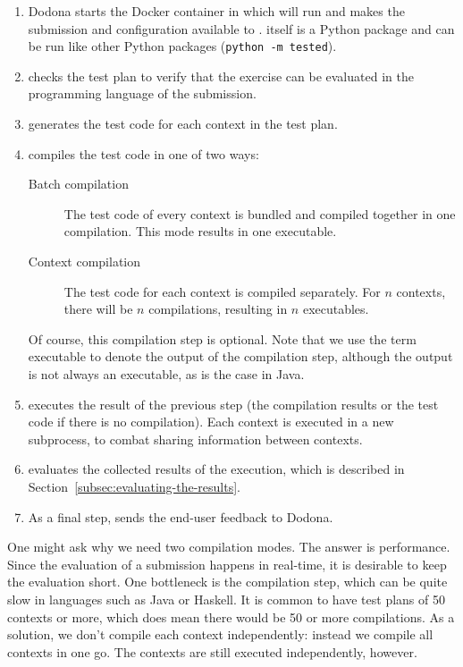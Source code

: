 \documentclass[5p,number]{elsarticle}
\begin{document}
    \begin{enumerate}
        \item Dodona starts the Docker container in which \tested{} will run and makes the submission and configuration available to \tested{}.
        \tested{} itself is a Python package and can be run like other Python packages (\texttt{python -m tested}).
        \item \tested{} checks the test plan to verify that the exercise can be evaluated in the programming language of the submission.
        \item \tested{} generates the test code for each context in the test plan.
        \item \tested{} compiles the test code in one of two ways:
        \begin{description}
            \item[Batch compilation] The test code of every context is bundled and compiled together in one compilation.
            This mode results in one executable.
            \item[Context compilation] The test code for each context is compiled separately.
            For $n$ contexts, there will be $n$ compilations, resulting in $n$ executables.
        \end{description}
        Of course, this compilation step is optional.
        Note that we use the term executable to denote the output of the compilation step, although the output is not always an executable, as is the case in Java.
        \item \tested{} executes the result of the previous step (the compilation results or the test code if there is no compilation).
        Each context is executed in a new subprocess, to combat sharing information between contexts.
        \item \tested{} evaluates the collected results of the execution, which is described in Section~\ref{subsec:evaluating-the-results}.
        \item As a final step, \tested{} sends the end-user feedback to Dodona.
    \end{enumerate}
    
    One might ask why we need two compilation modes.
    The answer is performance.
    Since the evaluation of a submission happens in real-time, it is desirable to keep the evaluation short.
    One bottleneck is the compilation step, which can be quite slow in languages such as Java or Haskell.
    It is common to have test plans of 50 contexts or more, which does mean there would be 50 or more compilations.
    As a solution, we don't compile each context independently: instead we compile all contexts in one go.
    The contexts are still executed independently, however.
\end{document}

